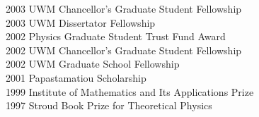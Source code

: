 \documentclass[12pt,notitlepage]{report}
\begin{document}
\begin{startvita}
\end{startvita}

\renewenvironment{thebibliography}[1]%
  {\begin{list}{\labelenumi\hss}%
     {\usecounter{enumi}\setlength{\labelwidth}{3em}%
      \setlength{\leftmargin}{5em}}}%
  {\end{list}}
\renewcommand{\bibitem}[1]{\item\label{#1}\relax}%
\renewcommand{\theenumi}{\arabic{enumi}}%
\begin{publications}
\putbib[papers]
\end{publications}

\begin{honorarysocieties}
2003 \> UWM Chancellor's Graduate Student Fellowship\\
2003 \> UWM Dissertator Fellowship\\
2002 \> Physics Graduate Student Trust Fund Award\\
2002 \> UWM Chancellor's Graduate Student Fellowship\\
2002 \> UWM Graduate School Fellowship\\
2001 \> Papastamatiou Scholarship\\
1999 \> Institute of Mathematics and Its Applications Prize\\
1997 \> Stroud Book Prize for Theoretical Physics
\end{honorarysocieties}

\finishvita
\end{document}
